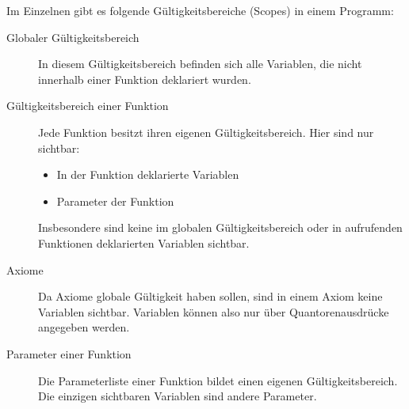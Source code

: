 Im Einzelnen gibt es folgende Gültigkeitsbereiche (Scopes) in einem Programm:

\begin{description}
	\item[Globaler Gültigkeitsbereich] In diesem Gültigkeitsbereich befinden sich alle Variablen, die nicht innerhalb einer Funktion deklariert wurden.
	\item[Gültigkeitsbereich einer Funktion] Jede Funktion besitzt ihren eigenen Gültigkeitsbereich. Hier sind nur sichtbar: \begin{itemize}
		\item In der Funktion deklarierte Variablen
		\item Parameter der Funktion
	\end{itemize}
	Insbesondere sind keine im globalen Gültigkeitsbereich oder in aufrufenden Funktionen deklarierten Variablen sichtbar.
	\item[Axiome] Da Axiome globale Gültigkeit haben sollen, sind in einem Axiom keine Variablen sichtbar. Variablen können also nur über Quantorenausdrücke angegeben werden.
	\item[Parameter einer Funktion] Die Parameterliste einer Funktion bildet einen eigenen Gültigkeitsbereich. Die einzigen sichtbaren Variablen sind andere Parameter.
\end{description}



